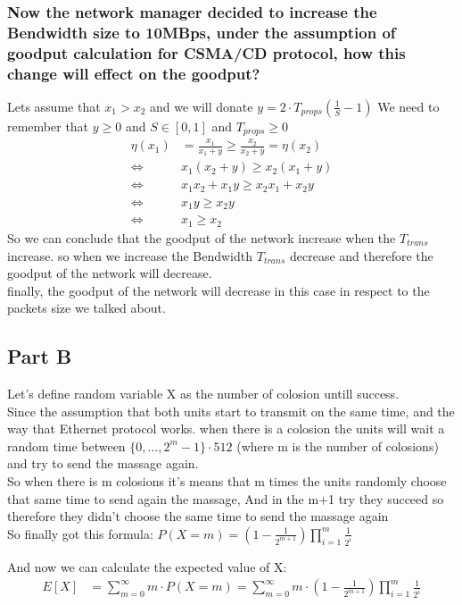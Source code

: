 \documentclass{article}
\begin{document}
\subsubsection{Now the network manager decided to increase the Bendwidth size to 10MBps, under the assumption of goodput calculation for CSMA/CD protocol, how this change will effect on the goodput?}
Lets assume that $x_1 > x_2$ and we will donate $y= 2\cdot T_{props}(\frac{1}{S}-1)$
We need to remember that $y \geq 0$ and $S \in [0,1]$ and $T_{props} \geq 0$
\begin{equation}
    \begin{aligned}
        \eta(x_1) &= \frac{x_1}{x_1+ y} \geq \frac{x_2}{x_2+ y} = \eta(x_2)\\
        \iff & x_1(x_2+ y) \geq x_2(x_1+y)\\
        \iff & x_1x_2 + x_1y \geq x_2x_1 + x_2y\\
        \iff & x_1y \geq x_2y\\
        \iff & x_1 \geq x_2
    \end{aligned}
\end{equation}
So we can conclude that the goodput of the network increase when the $T_{trans}$ increase.
so when we increase the Bendwidth $T_{trans}$ decrease and therefore the goodput of the network will decrease.\\
finally, the goodput of the network will decrease in this case in respect to the packets size we talked about.
\subsection{Part B}
Let's define random variable X as the number of colosion untill success.\\
Since the assumption that both units start to transmit on the same time, and the way that Ethernet protocol works.
when there is a colosion the units will wait a random time between $\{0,...,2^{m}-1\}\cdot 512$ (where m is the number of colosions) and try to send the massage again.\\
So when there is m colosions it's means that m times the units randomly choose that same time to send again the massage, And in the m+1 try they succeed so therefore they didn't choose the same time to send the massage again\\
So finally got this formula: $P(X=m)= (1-\frac{1}{2^{m+1}})\prod^{m}_{i=1}\frac{1}{2^{i}}$

And now we can calculate the expected value of X:
\begin{equation}
    \begin{aligned}
        E[X] &= \sum^{\infty}_{m=0} m\cdot P(X=m) = \sum^{\infty}_{m=0} m\cdot (1-\frac{1}{2^{m+1}})\prod^{m}_{i=1}\frac{1}{2^{i}} \\
    \end{aligned}
\end{equation}
\end{document}
